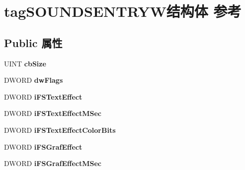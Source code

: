 \hypertarget{structtag_s_o_u_n_d_s_e_n_t_r_y_w}{}\section{tag\+S\+O\+U\+N\+D\+S\+E\+N\+T\+R\+Y\+W结构体 参考}
\label{structtag_s_o_u_n_d_s_e_n_t_r_y_w}
\subsection*{Public 属性}
\begin{DoxyCompactItemize}
\item 
\mbox{\label{structtag_s_o_u_n_d_s_e_n_t_r_y_w_a32efce0e1c741347742376e2e8bc3bc9}} 
U\+I\+NT {\bfseries cb\+Size}
\item 
\mbox{\label{structtag_s_o_u_n_d_s_e_n_t_r_y_w_acbe9b694ac46749e3e0700f0c567d862}} 
D\+W\+O\+RD {\bfseries dw\+Flags}
\item 
\mbox{\label{structtag_s_o_u_n_d_s_e_n_t_r_y_w_acb4104ac12aa4a51522d57969549ffee}} 
D\+W\+O\+RD {\bfseries i\+F\+S\+Text\+Effect}
\item 
\mbox{\label{structtag_s_o_u_n_d_s_e_n_t_r_y_w_a252293a51288faf9dfd3c8835315e46f}} 
D\+W\+O\+RD {\bfseries i\+F\+S\+Text\+Effect\+M\+Sec}
\item 
\mbox{\label{structtag_s_o_u_n_d_s_e_n_t_r_y_w_a8a02e913656ea7d28dd7ebce6032e59b}} 
D\+W\+O\+RD {\bfseries i\+F\+S\+Text\+Effect\+Color\+Bits}
\item 
\mbox{\label{structtag_s_o_u_n_d_s_e_n_t_r_y_w_aa34932524bb9b07da5daa540ef75f686}} 
D\+W\+O\+RD {\bfseries i\+F\+S\+Graf\+Effect}
\item 
\mbox{\label{structtag_s_o_u_n_d_s_e_n_t_r_y_w_a344160a0823c8d803d0275130736b3bb}} 
D\+W\+O\+RD {\bfseries i\+F\+S\+Graf\+Effect\+M\+Sec}
\item 
\mbox{\label{structtag_s_o_u_n_d_s_e_n_t_r_y_w_a30e5ae005d2e6977ea4f1ffbd83ee34c}} 

\end{DoxyCompactItemize}

